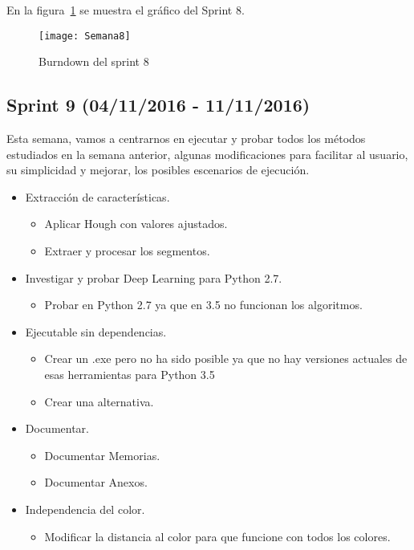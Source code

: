 En la figura~\ref{fig:A.2.8} se muestra el gráfico del Sprint 8.

\begin{figure}[h]
\centering
\texttt{[image: Semana8]}
\caption{Burndown del sprint 8}
\label{fig:A.2.8}
\end{figure}

\subsection{Sprint 9 (04/11/2016 - 11/11/2016)}

Esta semana, vamos a centrarnos en ejecutar y probar todos los métodos estudiados en la semana anterior, algunas modificaciones para facilitar al usuario, su simplicidad y mejorar, los posibles escenarios de ejecución.


\begin{itemize}
	\item Extracción de características.
		\begin{itemize}
			\item Aplicar Hough con valores ajustados.
			\item Extraer y procesar los segmentos.
		\end{itemize}
	\item Investigar y probar Deep Learning para Python 2.7.
		\begin{itemize}
			\item Probar en Python 2.7 ya que en 3.5 no funcionan los algoritmos.
		\end{itemize}
	\item Ejecutable sin dependencias.
		\begin{itemize}
			\item Crear un .exe pero no ha sido posible ya que no hay versiones actuales de esas herramientas para Python 3.5
			\item Crear una alternativa.
		\end{itemize}
	\item Documentar.
		\begin{itemize}
			\item Documentar Memorias. 
			\item Documentar Anexos.
		\end{itemize}
	\item Independencia del color.
		\begin{itemize}
			\item Modificar la distancia al color para que funcione con todos los colores.
		\end{itemize}
\end{itemize}

